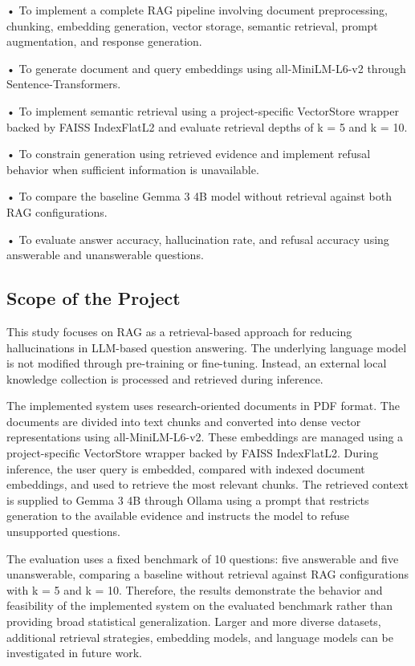 \documentclass[conference]{IEEEtran}
\begin{document}
• To implement a complete RAG pipeline involving document preprocessing, chunking, embedding generation, vector storage, semantic retrieval, prompt augmentation, and response generation.

• To generate document and query embeddings using all-MiniLM-L6-v2 through Sentence-Transformers.

• To implement semantic retrieval using a project-specific VectorStore wrapper backed by FAISS IndexFlatL2 and evaluate retrieval depths of k = 5 and k = 10.

• To constrain generation using retrieved evidence and implement refusal behavior when sufficient information is unavailable.

• To compare the baseline Gemma 3 4B model without retrieval against both RAG configurations.

• To evaluate answer accuracy, hallucination rate, and refusal accuracy using answerable and unanswerable questions.
\subsection{Scope of the Project}
This study focuses on RAG as a retrieval-based approach for reducing hallucinations in LLM-based question answering. The underlying language model is not modified through pre-training or fine-tuning. Instead, an external local knowledge collection is processed and retrieved during inference.

The implemented system uses research-oriented documents in PDF format. The documents are divided into text chunks and converted into dense vector representations using all-MiniLM-L6-v2. These embeddings are managed using a project-specific VectorStore wrapper backed by FAISS IndexFlatL2. During inference, the user query is embedded, compared with indexed document embeddings, and used to retrieve the most relevant chunks. The retrieved context is supplied to Gemma 3 4B through Ollama using a prompt that restricts generation to the available evidence and instructs the model to refuse unsupported questions.

The evaluation uses a fixed benchmark of 10 questions: five answerable and five unanswerable, comparing a baseline without retrieval against RAG configurations with k = 5 and k = 10. Therefore, the results demonstrate the behavior and feasibility of the implemented system on the evaluated benchmark rather than providing broad statistical generalization. Larger and more diverse datasets, additional retrieval strategies, embedding models, and language models can be investigated in future work.
\end{document}
